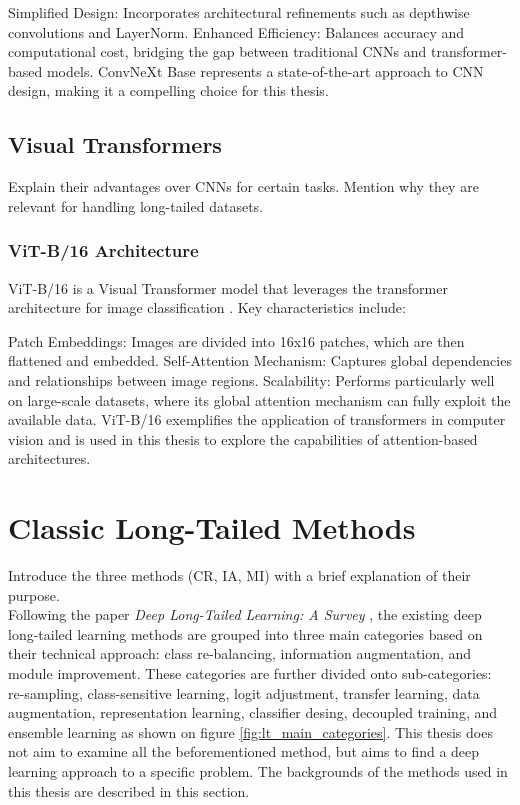 Simplified Design: Incorporates architectural refinements such as depthwise convolutions and LayerNorm.
Enhanced Efficiency: Balances accuracy and computational cost, bridging the gap between traditional CNNs and transformer-based models. ConvNeXt Base represents a state-of-the-art approach to CNN design, making it a compelling choice for this thesis.


\subsection{Visual Transformers}
Explain their advantages over CNNs for certain tasks.
Mention why they are relevant for handling long-tailed datasets.

\subsubsection{ViT-B/16 Architecture}
ViT-B/16 is a Visual Transformer model that leverages the transformer architecture for image classification \cite{dosovitskiy2021imageworth16x16words}. Key characteristics include:

Patch Embeddings: Images are divided into 16x16 patches, which are then flattened and embedded.
Self-Attention Mechanism: Captures global dependencies and relationships between image regions.
Scalability: Performs particularly well on large-scale datasets, where its global attention mechanism can fully exploit the available data. ViT-B/16 exemplifies the application of transformers in computer vision and is used in this thesis to explore the capabilities of attention-based architectures.


\section{Classic Long-Tailed Methods}
\label{sec:lt_methods}
Introduce the three methods (CR, IA, MI) with a brief explanation of their purpose.\\

Following the paper \textit{Deep Long-Tailed Learning: A Survey} \cite{zhang2023deep}, the existing deep long-tailed learning methods are grouped into three main categories based on their technical approach: class re-balancing, information augmentation, and module improvement. These categories are further divided onto sub-categories: re-sampling, class-sensitive learning, logit adjustment, transfer learning, data augmentation, representation learning, classifier desing, decoupled training, and ensemble learning as shown on figure \ref{fig:lt_main_categories}. This thesis does not aim to examine all the beforementioned method, but aims to find a deep learning approach to a specific problem. The backgrounds of the methods used in this thesis are described in this section.


